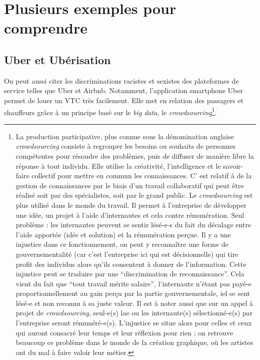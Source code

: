 \documentclass[a4paper,12pt]{report}
\begin{document}
\section{Plusieurs exemples pour comprendre}

\subsection{Uber et Ubérisation}

On peut aussi citer les discriminations racistes et sexistes des plateformes de service telles que Uber et Airbnb. Notamment, l'application smartphone Uber permet de louer un VTC très facilement. Elle met en relation des passagers et chauffeurs grâce à un principe basé sur le \textit{big data}, le \textit{crowdsourcing}\footnote{La production participative, plus connue sous la dénomination anglaise \textit{crowdsourcing} consiste à regrouper les besoins ou souhaits de personnes compétentes pour résoudre des problèmes, puis de diffuser de manière libre la réponse à tout individu. Elle utilise la créativité, l'intelligence et le savoir-faire collectif pour mettre en commun les connaissances. C' est relatif à de la gestion de connaissances par le biais d'un travail collaboratif qui peut être réalisé soit par des spécialistes, soit par le grand public. Le \textit{crowdsourcing} est plus utilisé dans le monde du travail. Il permet à l'entreprise de développer une idée, un projet à l'aide d'internautes et cela contre rémunération. Seul problème : les internautes peuvent se sentir lésé-e-s du fait du décalage entre l'aide apportée (idée et solution) et la rémunération perçue. Il y a une injustice dans ce fonctionnement, on peut y reconnaître une forme de gouvernementalité (car c'est l'entreprise ici qui est décisionnelle) qui tire profit des individus alors qu'ils consentent à donner de l'information. Cette injustice peut se traduire par une ``discrimination de reconnaissance''. Cela vient du fait que ``tout travail mérite salaire'', l'internaute n'étant pas payé-e proportionnellement au gain perçu par la partie gouvernementale, iel se sent lésé-e et non reconnu à sa juste valeur. Il est à noter aussi que sur un appel à projet de \textit{crowdsourcing}, seul-e(s) lae ou les internaute(s) sélectionné-e(s) par l'entreprise seront rémunéré-e(s). L'injustice se situe alors pour celles et ceux qui auront consacré leur temps et leur réflexion pour rien ; on retrouve beaucoup ce problème dans le monde de la création graphique, où les artistes ont du mal à faire valoir leur métier.}.
\end{document}
